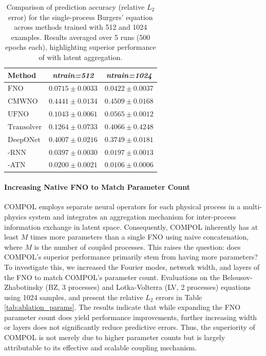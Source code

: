 \begin{table}[!htbp]
	\setlength{\intextsep}{1pt}%
	\setlength{\columnsep}{5pt}%
	\centering
	\renewcommand{\arraystretch}{1.0}
	\setlength{\tabcolsep}{0.2em}
	{\small
		\begin{tabular}{@{}lcc@{}}
			\hline
			\textbf{Method} & \textit{ntrain=512} & \textit{ntrain=1024} \\
			\hline
			$\text{FNO}$ & $0.0715 \pm 0.0033$ & $0.0422 \pm 0.0037$ \\
			CMWNO & $0.4441 \pm 0.0134$ & $0.4509 \pm 0.0168$ \\
			$\text{UFNO}$ & $0.1043 \pm 0.0061$ & $0.0565 \pm 0.0012$ \\
			$\text{Transolver}$ & $0.1264 \pm 0.0733$ & $0.4066 \pm 0.4248$ \\
			$\text{DeepONet}$ & $0.4007 \pm 0.0216$ & $0.3749 \pm 0.0181$ \\
			\ours-RNN & $0.0397 \pm 0.0030$ & $0.0197 \pm 0.0013$ \\
			\ours-ATN & $\mathbf{0.0200 \pm 0.0021}$ & $\mathbf{0.0106 \pm 0.0006}$ \\
			\hline
	\end{tabular}}
	\caption{\small Comparison of prediction accuracy (relative $L_2$ error) for the single-process Burgers' equation across methods trained with 512 and 1024 examples. Results averaged over 5 runs (500 epochs each), highlighting superior performance of \ours with latent aggregation.}
	\label{tab:ablation_single}
\end{table}

\paragraph{Increasing Native FNO to Match Parameter Count}
COMPOL employs separate neural operators for each physical process in a multi-physics system and integrates an aggregation mechanism for inter-process information exchange in latent space. Consequently, COMPOL inherently has at least $M$ times more parameters than a single FNO using naive concatenation, where $M$ is the number of coupled processes. This raises the question: does COMPOL's superior performance primarily stem from having more parameters? To investigate this, we increased the Fourier modes, network width, and layers of the FNO to match COMPOL's parameter count. Evaluations on the Belousov-Zhabotinsky (BZ, 3 processes) and Lotka-Volterra (LV, 2 processes) equations using 1024 samples, and present the relative $L_2$ errors in Table \ref{tab:ablation_params}. The results indicate that while expanding the FNO parameter count does yield performance improvements, further increasing width or layers does not significantly reduce predictive errors. Thus, the superiority of COMPOL is not merely due to higher parameter counts but is largely attributable to its effective and scalable coupling mechanism.
